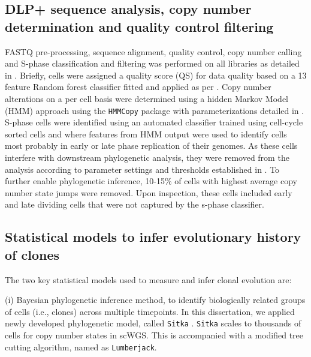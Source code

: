 \subsection{DLP+ sequence analysis, copy number determination and quality control filtering}
FASTQ pre-processing, sequence alignment, quality control, copy number calling and S-phase classification and filtering was performed on all libraries as detailed in \cite{laks2019clonal}. Briefly, cells were assigned a quality score (QS) for data quality based on a 13 feature Random forest classifier fitted and applied as per \cite{laks2019clonal}. Copy number alterations on a per cell basis were determined using a hidden Markov Model (HMM) approach using the \texttt{HMMCopy} package with parameterizations detailed in \cite{laks2019clonal}. S-phase cells were identified using an automated classifier trained using cell-cycle sorted cells and where features from HMM output were used to identify cells most probably in early or late phase replication of their genomes. As these cells interfere with downstream phylogenetic analysis, they were removed from the analysis according to parameter settings and thresholds established in \cite{laks2019clonal}. To further enable phylogenetic inference, 10-15\% of cells with highest average copy number state jumps were removed. Upon inspection, these cells included early and late dividing cells that were not captured by the s-phase classifier. 
 
\subsection{Statistical models to infer evolutionary history of clones}
The two key statistical models used to measure and infer clonal evolution are: 
 
 (i) Bayesian phylogenetic inference method, to identify biologically related groups of cells (i.e., clones) across multiple timepoints. 
 In this dissertation, we applied newly developed phylogenetic model, called \texttt{Sitka} \cite{dorri2020efficient}. \texttt{Sitka} scales to thousands of cells for copy number states in scWGS. This is accompanied with a modified tree cutting algorithm, named as \texttt{Lumberjack}.

